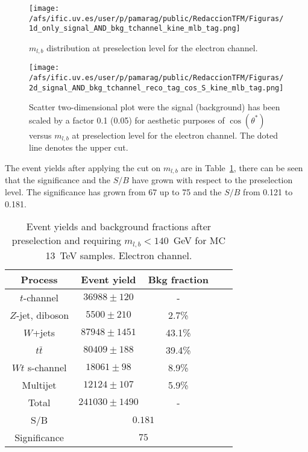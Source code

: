 \begin{figure}[h]
\centering
\texttt{[image: /afs/ific.uv.es/user/p/pamarag/public/RedaccionTFM/Figuras/1d\_only\_signal\_AND\_bkg\_tchannel\_kine\_mlb\_tag.png]}
\caption{$m_{l,b}$ distribution at preselection level for the electron channel.}
\label{Fig:mlbDistribution}
\end{figure}




\begin{figure}[h]
\centering
\texttt{[image: /afs/ific.uv.es/user/p/pamarag/public/RedaccionTFM/Figuras/2d\_signal\_AND\_bkg\_tchannel\_reco\_tag\_cos\_S\_kine\_mlb\_tag.png]}
\caption{Scatter two-dimensional plot were the signal (background) has been scaled by a factor 0.1 (0.05) for aesthetic purposes of $\cos(\theta^{*})$ versus $m_{l,b}$ at preselection level for the electron channel. The doted line denotes the upper cut.}
\label{Fig:mlbVScosS}
\end{figure}

The event yields after applying the cut on $m_{l,b}$ are in Table~\ref{Table:mlbevents}, there can be seen that the significance and the $S/B$ have grown with respect to the preselection level. The significance has grown from 67 up to 75 and the $S/B$ from 0.121 to 0.181.
\begin{table} [h]
\begin{center}
\begin{tabular}{|c|c|c|c|c|} 
 \hline
 Process & Event yield & Bkg fraction \\ \hline
 $t$-channel & $36988 \pm 120 $ & - \\ 
 $Z$-jet, diboson & $5500 \pm 210 $&  2.7\% \\ 
 $W$+jets & $87948 \pm  1451$ & 43.1\%\\
 $t\bar{t}$& $80409 \pm 188$ & 39.4\%\\
 $Wt$ s-channel & $18061 \pm 98$ & 8.9\% \\
 Multijet&$12124\pm 107 $&5.9\%\\
 \hline
 Total & $241030 \pm 1490$ & - \\ \hline \hline
 S/B &\multicolumn{2}{|c|}{$0.181$} \\ \hline
 Significance &\multicolumn{2}{|c|}{$75$} \\ \hline
\end{tabular}
\caption{Event yields and background fractions after preselection and requiring $m_{l,b} < 140$~GeV for MC 13~TeV samples. Electron channel.}
\label{Table:mlbevents}
\end{center}
\end{table}


